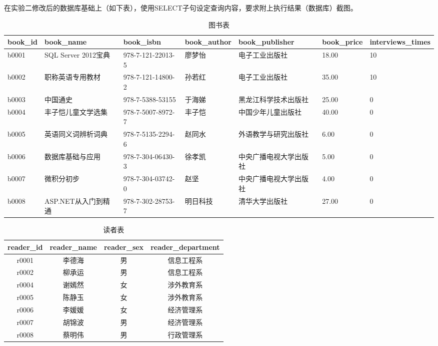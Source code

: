 \documentclass[a4paper]{article}
\begin{document}
在实验二修改后的数据库基础上（如下表），使用SELECT子句设定查询内容，要求附上执行结果（数据库）截图。

\begin{table}[H]
\centering
\caption{图书表}
\label{tab:books}
\begin{tabular}{|p{1.2cm}|p{2.5cm}|p{2.5cm}|p{2.5cm}|p{2.5cm}|p{2.5cm}|p{2.5cm}|}
\hline
\textbf{book\_id} & \textbf{book\_name} & \textbf{book\_isbn} & \textbf{book\_author} & \textbf{book\_publisher} & \textbf{book\_price}& \textbf{interviews\_times}  \\
\hline
b0001 & SQL Server 2012宝典 & 978-7-121-22013-5 & 廖梦怡 & 电子工业出版社 & 18.00 & 10 \\
\hline
b0002 & 职称英语专用教材 & 978-7-121-14800-2 & 孙若红 & 电子工业出版社 & 35.00 & 10 \\
\hline
b0003 & 中国通史 & 978-7-5388-53155 & 于海娣 & 黑龙江科学技术出版社 & 25.00 & 0 \\
\hline
b0004 & 丰子恺儿童文学选集 & 978-7-5007-8972-7 & 丰子恺 & 中国少年儿童出版社 & 40.00 & 0 \\
\hline
b0005 & 英语同义词辨析词典 & 978-7-5135-2294-6 & 赵同水 & 外语教学与研究出版社 & 6.00 & 0 \\
\hline
b0006 & 数据库基础与应用 & 978-7-304-06430-3 & 徐孝凯 & 中央广播电视大学出版社 & 5.00 & 0 \\
\hline
b0007 & 微积分初步 & 978-7-304-03742-0 & 赵坚 & 中央广播电视大学出版社 & 4.00 & 0 \\
\hline
b0008 & ASP.NET从入门到精通 & 978-7-302-28753-7 & 明日科技 & 清华大学出版社 & 27.00 & 0 \\
\hline
\end{tabular}
\end{table}

\begin{table}[H]
\centering
\caption{读者表}
\label{tab:readers}
\begin{tabular}{|c|c|c|c|}
\hline
\textbf{reader\_id} & \textbf{reader\_name} & \textbf{reader\_sex} & \textbf{reader\_department} \\
\hline
r0001 & 李德海 & 男 & 信息工程系 \\
\hline
r0002 & 柳承运 & 男 & 信息工程系 \\
\hline
r0004 & 谢嫣然 & 女 & 涉外教育系 \\
\hline
r0005 & 陈静玉 & 女 & 涉外教育系 \\
\hline
r0006 & 李媛媛 & 女 & 经济管理系 \\
\hline
r0007 & 胡锦波 & 男 & 经济管理系 \\
\hline
r0008 & 蔡明伟 & 男 & 行政管理系 \\
\hline
\end{tabular}
\end{table}
\end{document}
